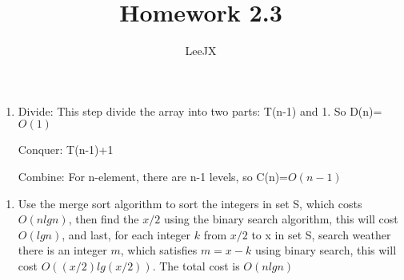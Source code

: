 \documentclass{article}
\title{Homework 2.3}
\author{LeeJX}
\begin{document}
\maketitle

\begin{enumerate}[\textbf{2.3}-4]
\item 
\par Divide: This step divide the array into two parts: T(n-1) and 1. So D(n)=$O(1)$
\par Conquer: T(n-1)+1
\par Combine: For n-element, there are n-1 levels, so C(n)=$O(n-1)$
\end{enumerate}
\begin{enumerate}[\textbf{2.3}-7]
\item 
\par Use the merge sort algorithm to sort the integers in set S, which costs $O(nlgn)$, then find the $x/2$ using the binary search algorithm, this will cost $O(lgn)$, and last, for each integer $k$ from $x/2$ to x in set S, search weather there is an integer $m$, which satisfies $m=x-k$ using binary search, this will cost $O((x/2)lg(x/2))$. The total cost is $O(nlgn)$
\end{enumerate}
\end{document}
